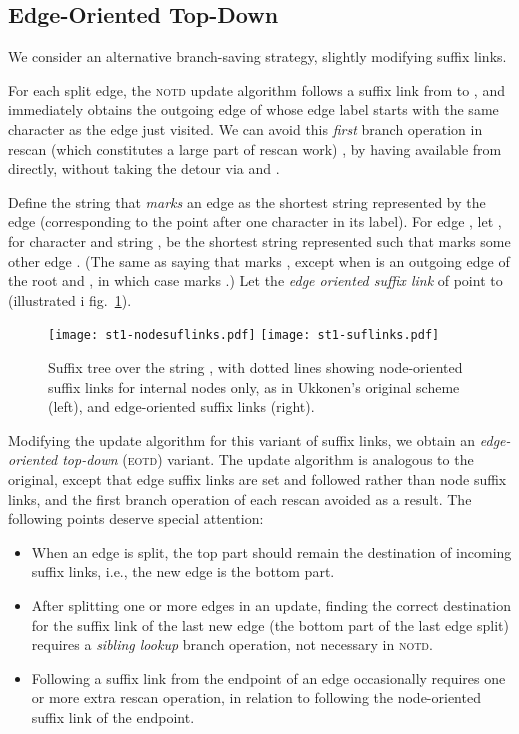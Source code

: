\documentclass{llncs}
\newcommand\notd{\textsc{notd}\xspace}
\newcommand\eotd{\textsc{eotd}\xspace}
\begin{document}
\subsection{Edge-Oriented Top-Down}\label{sec-eotd}

We consider an alternative branch-saving strategy, slightly modifying
suffix links.

For each split edge, the \notd update algorithm follows a suffix link from
 to , and immediately obtains the outgoing edge  of
 whose edge label starts with the same character as the edge just
visited. We can avoid this
\emph{first} branch operation in rescan (which constitutes a large part of
rescan work)
, by having  available from  directly, without taking the detour via
 and .

Define the string that \emph{marks} an edge as the shortest string represented
by the edge
(corresponding to the point after one character in its label). For edge ,
let , for character  and string , be the shortest string represented
 such that  marks some other edge . (The same as saying that 
marks , except when  is an outgoing edge of the root and , in
which case  marks .) Let the \emph{edge oriented suffix link} of 
point to  (illustrated i fig.~\ref{fig-st}).

\begin{figure}[t]
\begin{center}
\texttt{[image: st1-nodesuflinks.pdf]}
\hfil
\texttt{[image: st1-suflinks.pdf]}
\end{center}
\caption{\label{fig-st}Suffix tree over the string , with dotted lines
  showing node-oriented suffix links for internal nodes only, as in Ukkonen's
  original scheme (left), and
  edge-oriented suffix links (right).}
\end{figure}
 
\label{sec-siblinglookup}Modifying the update algorithm for this variant of suffix links, we obtain an
\emph{edge-oriented top-down} (\eotd) variant. The update algorithm is
analogous to the original, except that edge suffix links are set and followed
rather than node suffix links, and the first branch operation of each rescan
avoided as a result. The following points deserve special attention:
\begin{itemize}
\item When an edge is split, the top part should remain the destination of
  incoming suffix links, i.e., the new edge is the bottom part.
\item After splitting one or more edges in an update, finding the correct
  destination for the suffix link of the last new edge (the bottom part of the
  last edge split) requires a \emph{sibling lookup} branch operation, not
  necessary in \notd.
\item Following a suffix link from the endpoint of an edge occasionally
  requires one or more extra rescan operation, in relation to following the
  node-oriented suffix link of the endpoint.
\end{itemize}
\end{document}
